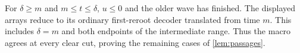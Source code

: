 For $\delta\ge m$ and $m\le t\le\delta$, $u\le0$ and the older wave has finished. The displayed arrays reduce to its ordinary first-reroot decoder translated from time $m$. This includes $\delta=m$ and both endpoints of the intermediate range. Thus the macro agrees at every clear cut, proving the remaining cases of \cref{lem:passages}.
